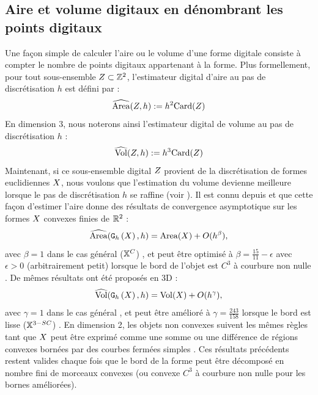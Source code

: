 \subsection{Aire et volume digitaux en dénombrant les points digitaux}
\label{sec:AreaByCounting}
%
Une façon simple de calculer l'aire ou le volume d'une forme digitale consiste à
compter le nombre de points digitaux appartenant à la forme. Plus formellement,
pour tout sous-ensemble $Z \subset \mathbb{Z}^2$, l'estimateur digital d'aire au pas
de discrétisation $h$ est défini par :
%
\begin{equation}
  \widehat{\mathrm{Area}}(Z, h) := h^2 \mathrm{Card}(Z)
\end{equation}
%
En dimension $3$, nous noterons ainsi l'estimateur digital de volume au pas de
discrétisation $h$ :
%
\begin{equation}
  \widehat{\mathrm{Vol}}(Z, h) := h^3 \mathrm{Card}(Z)
\end{equation}
%
Maintenant, si ce sous-ensemble digital $Z$ provient de la discrétisation de
formes euclidiennes $X$, nous voulons que l'estimation du volume devienne
meilleure lorsque le pas de discrétisation $h$ se raffine (voir
). Il est connu depuis
 et  que cette façon d'estimer l'aire donne
des résultats de convergence asymptotique sur les formes $X$ convexes
finies de $\mathbb{R}^2$ :
%
\begin{equation}
  \label{eq:AreaByCountingConv}
  \widehat{\mathrm{Area}}(\mathtt{G}_{h}\left(X\right),h) = \mathrm{Area}(X) + O(h^\beta),
\end{equation}
%
avec $\beta = 1$ dans le cas général ($\mathbb{X}^{C}$) \cite{Klette2000}, et peut être optimisé à
$\beta = \frac{15}{11} - \epsilon$ avec $\epsilon > 0$ (arbitrairement petit)
lorsque le bord de l'objet est $C^3$ à courbure non nulle \cite{Huxley1990}.
De mêmes résultats ont été proposés en 3D :
%
\begin{equation}
  \label{eq:VolumeByCountingConv}
  \widehat{\mathrm{Vol}}(\mathtt{G}_{h}\left(X\right),h) = \mathrm{Vol}(X) + O(h^\gamma),
\end{equation}
%
avec $\gamma = 1$ dans le cas général \cite{Kratzel1988}, et peut être amélioré à
$\gamma=\frac{243}{158}$ lorsque le bord est lisse ($\mathbb{X}^{3-SC}$) \cite{Guo2010}.
%
En dimension 2, les objets non convexes suivent les mêmes règles tant que
$X$ peut être exprimé comme une somme ou une différence de régions convexes
bornées par des courbes fermées simples \cite{Huxley1996}. Ces résultats
précédents restent valides chaque fois que le bord de la forme peut être
décomposé en nombre fini de morceaux convexes (ou convexe $C^3$ à courbure non
nulle pour les bornes améliorées).
%
